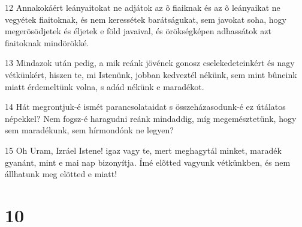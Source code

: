 {\par 12 Annakokáért leányaitokat ne adjátok az õ fiaiknak és az õ leányaikat ne vegyétek fiaitoknak, és nem keressétek barátságukat, sem javokat soha, hogy megerõsödjetek és éljetek e föld javaival, és örökségképen adhassátok azt fiaitoknak mindörökké.
\par 13 Mindazok után pedig, a mik reánk jövének gonosz cselekedeteinkért és nagy vétkünkért, hiszen te, mi Istenünk, jobban kedveztél nékünk, sem mint bûneink miatt érdemeltünk volna, s adád nékünk e maradékot.
\par 14 Hát megrontjuk-é ismét parancsolataidat s összeházasodunk-é ez útálatos népekkel? Nem fogsz-é haragudni reánk mindaddig, míg megemésztetünk, hogy sem maradékunk, sem hírmondónk ne legyen?
\par 15 Oh Uram, Izráel Istene! igaz vagy te, mert meghagytál minket, maradék gyanánt, mint e mai nap bizonyítja. Ímé elõtted vagyunk vétkünkben, és nem állhatunk meg elõtted e miatt!

\chapter{10}

}

